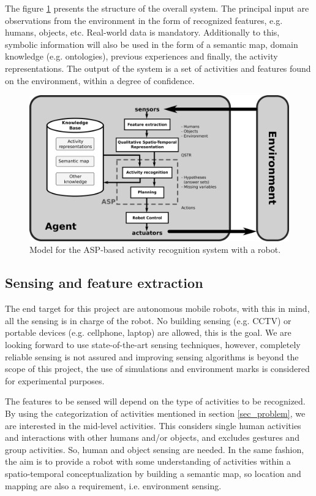 The figure \ref{fig:structure} presents the structure of the overall system.
The principal input are observations from the environment in the form of recognized features, e.g. humans, objects, etc.
Real-world data is mandatory.
Additionally to this, symbolic information will also be used in the form of a semantic map, domain knowledge (e.g. ontologies), previous experiences and finally, the activity representations.
The output of the system is a set of activities and features found on the environment, within a degree of confidence.

\begin{figure}[h]
\centering
\includegraphics[width=\textwidth]{fig/img_structure.pdf}
\caption{Model for the ASP-based activity recognition system with a robot.}
\label{fig:structure}
\end{figure}


\subsection{Sensing and feature extraction}

The end target for this project are autonomous mobile robots, with this in mind, all the sensing is in charge of the robot. 
No building sensing (e.g. CCTV) or portable devices (e.g. cellphone, laptop) are allowed, this is the goal.
We are looking forward to use state-of-the-art sensing techniques, however, completely reliable sensing is not assured and improving sensing algorithms is beyond the scope of this project, the use of simulations and environment marks is considered for experimental purposes. 

The features to be sensed will depend on the type of activities to be recognized.
By using the categorization of activities mentioned in section \ref{sec_problem}, we are interested in the mid-level activities.
This considers single human activities and interactions with other humans and/or objects, and excludes gestures and group activities.
So, human and object sensing are needed.
In the same fashion, the aim is to provide a robot with some understanding of activities within a spatio-temporal conceptualization by building a semantic map, so location and mapping are also a requirement, i.e. environment sensing.

